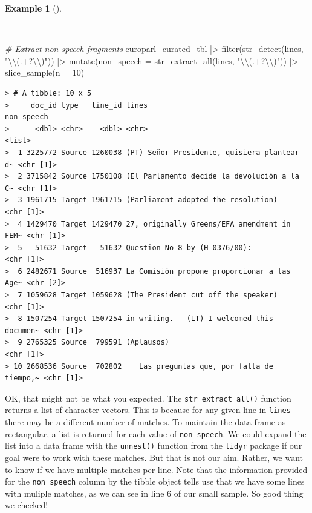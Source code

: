 \documentclass[
  letterpaper,
  DIV=11,
  numbers=noendperiod]{scrreport}
\newenvironment{Shaded}{\begin{snugshade}}{\end{snugshade}}
\newcommand{\AttributeTok}[1]{\textcolor[rgb]{0.00,0.00,0.00}{#1}}
\newcommand{\CommentTok}[1]{\textcolor[rgb]{0.00,0.00,0.00}{\textit{#1}}}
\newcommand{\DecValTok}[1]{\textcolor[rgb]{0.00,0.00,0.00}{#1}}
\newcommand{\FunctionTok}[1]{\textcolor[rgb]{0.00,0.00,0.00}{#1}}
\newcommand{\NormalTok}[1]{\textcolor[rgb]{0.00,0.00,0.00}{#1}}
\newcommand{\SpecialCharTok}[1]{\textcolor[rgb]{0.00,0.00,0.00}{#1}}
\newcommand{\StringTok}[1]{\textcolor[rgb]{0.00,0.00,0.00}{#1}}
\theoremstyle{definition}
\newtheorem{example}{Example}[chapter]
\theoremstyle{remark}
\begin{document}
\begin{example}[]\protect\hypertarget{exm-td-europarl-search-non-speech-3}{}\label{exm-td-europarl-search-non-speech-3}

~

\begin{Shaded}
\begin{Highlighting}[]
\CommentTok{\# Extract non{-}speech fragments}
\NormalTok{europarl\_curated\_tbl }\SpecialCharTok{|\textgreater{}}
  \FunctionTok{filter}\NormalTok{(}\FunctionTok{str\_detect}\NormalTok{(lines, }\StringTok{"}\SpecialCharTok{\textbackslash{}\textbackslash{}}\StringTok{(.+?}\SpecialCharTok{\textbackslash{}\textbackslash{}}\StringTok{)"}\NormalTok{)) }\SpecialCharTok{|\textgreater{}}
  \FunctionTok{mutate}\NormalTok{(}\AttributeTok{non\_speech =} \FunctionTok{str\_extract\_all}\NormalTok{(lines, }\StringTok{"}\SpecialCharTok{\textbackslash{}\textbackslash{}}\StringTok{(.+?}\SpecialCharTok{\textbackslash{}\textbackslash{}}\StringTok{)"}\NormalTok{)) }\SpecialCharTok{|\textgreater{}} 
  \FunctionTok{slice\_sample}\NormalTok{(}\AttributeTok{n =} \DecValTok{10}\NormalTok{)}
\end{Highlighting}
\end{Shaded}

\begin{verbatim}
> # A tibble: 10 x 5
>     doc_id type   line_id lines                                       non_speech
>      <dbl> <chr>    <dbl> <chr>                                       <list>    
>  1 3225772 Source 1260038 (PT) Señor Presidente, quisiera plantear d~ <chr [1]> 
>  2 3715842 Source 1750108 (El Parlamento decide la devolución a la C~ <chr [1]> 
>  3 1961715 Target 1961715 (Parliament adopted the resolution)         <chr [1]> 
>  4 1429470 Target 1429470 27, originally Greens/EFA amendment in FEM~ <chr [1]> 
>  5   51632 Target   51632 Question No 8 by (H-0376/00):               <chr [1]> 
>  6 2482671 Source  516937 La Comisión propone proporcionar a las Age~ <chr [2]> 
>  7 1059628 Target 1059628 (The President cut off the speaker)         <chr [1]> 
>  8 1507254 Target 1507254 in writing. - (LT) I welcomed this documen~ <chr [1]> 
>  9 2765325 Source  799591 (Aplausos)                                  <chr [1]> 
> 10 2668536 Source  702802    Las preguntas que, por falta de tiempo,~ <chr [1]>
\end{verbatim}

\end{example}

OK, that might not be what you expected. The
\texttt{str\_extract\_all()} function returns a list of character
vectors. This is because for any given line in \texttt{lines} there may
be a different number of matches. To maintain the data frame as
rectangular, a list is returned for each value of \texttt{non\_speech}.
We could expand the list into a data frame with the \texttt{unnest()}
function from the \texttt{tidyr} package if our goal were to work with
these matches. But that is not our aim. Rather, we want to know if we
have multiple matches per line. Note that the information provided for
the \texttt{non\_speech} column by the tibble object tells use that we
have some lines with muliple matches, as we can see in line 6 of our
small sample. So good thing we checked!
\end{document}
